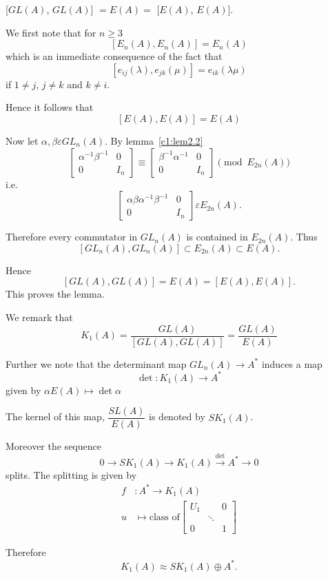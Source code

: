 \begin{Prop}\label{c1:Prop2.3}
[$GL(A)$, $GL(A)$] $= E(A) =$ [$E(A)$, $E(A)$].
\end{Prop}

\begin{Proof}
We first note that for $n\geq 3$
$$
[E_n(A), E_n(A)]=E_n(A)
$$
which is an immediate consequence of the fact that 
$$
[e_{ij}(\lambda), e_{jk}(\mu)]=e_{ik}(\lambda \mu)
$$
if $1\neq j$, $j\neq k$ and $k\neq i$.

Hence it follows that
$$
[E(A), E(A)]=E(A)
$$

Now let $\alpha, \beta \varepsilon GL_n(A)$. By lemma~\ref{c1:lem2.2}
$$
\begin{bmatrix}
\alpha^{-1}\beta^{-1} & 0\\
0 & I_n
\end{bmatrix} \equiv \begin{bmatrix}
\beta^{-1}\alpha^{-1} & 0\\
0 & I_n
\end{bmatrix}\pmod{E_{2n}(A)}
$$
i.e.
$$
\begin{bmatrix}
\alpha\beta\alpha^{-1}\beta^{-1} & 0\\
0 & I_n
\end{bmatrix} \varepsilon E_{2n}(A).
$$

Therefore every commutator in $GL_n(A)$ is contained in
$E_{2n}(A)$. Thus 
$$
[GL_n(A), GL_n(A)]\subset E_{2n}(A) \subset E(A).
$$

Hence
$$
[GL(A), GL(A)]=E(A)=[E(A),E(A)].
$$
This proves the lemma.

We remark that
$$
K_1(A)=\dfrac{GL(A)}{[GL(A),GL(A)]}=\dfrac{GL(A)}{E(A)}
$$

Further we note that the determinant map $GL_n(A)\rightarrow A^{\ast}$
induces a map 
$$
\det: K_1(A)\rightarrow A^{\ast}
$$
given by \qquad $\alpha E(A)\mapsto \det \alpha$

The kernel of this map, $\dfrac{SL(A)}{E(A)}$ is denoted by $SK_1(A)$.

Moreover the sequence
$$
0\rightarrow SK_1(A)\rightarrow K_1(A)\xrightarrow{\det}
A^{\ast}\rightarrow 0
$$
splits. The splitting is given by 
\begin{align*}
f&:A^{\ast} \rightarrow K_1(A)\\
u&\mapsto \text{class of} \begin{bmatrix}
U_1 & &0\\
& \ddots &\\
0 & &1
\end{bmatrix}
\end{align*}

Therefore
$$
K_1(A)\approx SK_1(A)\oplus A^{\ast}.
$$
\enprf
\end{Proof}

